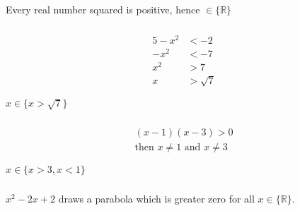 \documentclass[12pt]{article}
\begin{document}
Every real number squared is positive, hence $\in \{\mathbb{R}\}$

\subsubsection{}
\begin{equation*}
\begin{split}
5-x^2&<-2\\
-x^2 &< -7\\
x^2 &> 7\\
x &> \sqrt{7}
\end{split}
\end{equation*}

$x \in \{x> \sqrt{7}\}$

\subsubsection{}
\begin{equation*}
\begin{split}
(x-1)(x-3)>0\\
\text{then } x \neq 1 \text{ and } x \neq 3
\end{split}
\end{equation*}

$x \in \{x>3, x<1\}$

\subsubsection{}
$x^2-2x+2$ draws a parabola which is greater zero for all $x\in \{\mathbb{R}\}$.
\end{document}
